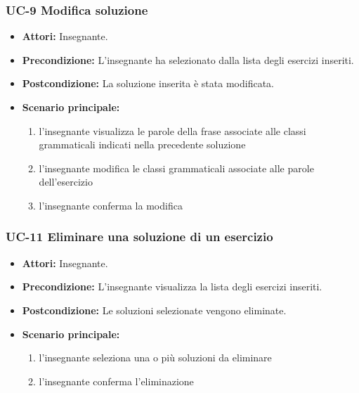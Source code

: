 \subsubsection{UC-9 Modifica soluzione}
\begin{itemize}
	\item \textbf{Attori:} Insegnante.
	\item \textbf{Precondizione:} L'insegnante ha selezionato dalla lista degli esercizi inseriti.
	\item \textbf{Postcondizione:} La soluzione inserita è stata modificata.
	\item \textbf{Scenario principale:}
		\begin{enumerate}
		\item l'insegnante visualizza le parole della frase associate alle classi grammaticali indicati nella precedente soluzione
		\item l'insegnante modifica le classi grammaticali associate alle parole dell'esercizio
		\item l'insegnante conferma la modifica
		\end{enumerate}
\end{itemize}
	
\subsubsection{UC-11 Eliminare una soluzione di un esercizio}
\begin{itemize}
	\item \textbf{Attori:} Insegnante.
	\item \textbf{Precondizione:} L'insegnante visualizza la lista degli esercizi inseriti.
	\item \textbf{Postcondizione:} Le soluzioni selezionate vengono eliminate.
	\item \textbf{Scenario principale:}
		\begin{enumerate}
			\item l'insegnante seleziona una o più soluzioni da eliminare
			\item l'insegnante conferma l'eliminazione
		\end{enumerate}
\end{itemize}

